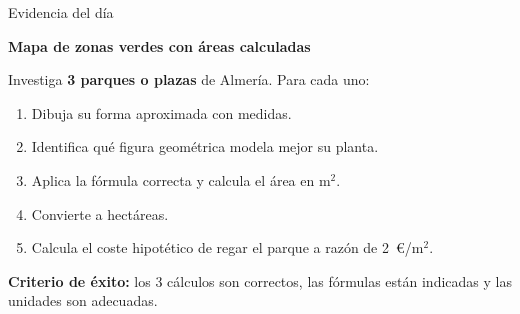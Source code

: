 \documentclass[aspectratio=169, 10pt, spanish]{beamer}
\begin{document}
\begin{frame}{Evidencia del día}
  \begin{evidenciabox}
    \textbf{Mapa de zonas verdes con áreas calculadas}

    \vspace{0.2cm}
    Investiga \textbf{3 parques o plazas} de Almería.
    Para cada uno:
    \begin{enumerate}
      \item Dibuja su forma aproximada con medidas.
      \item Identifica qué figura geométrica modela mejor su planta.
      \item Aplica la fórmula correcta y calcula el área en m$^2$.
      \item Convierte a hectáreas.
      \item Calcula el coste hipotético de regar el parque
            a razón de 2~€/m$^2$.
    \end{enumerate}
    \vspace{0.2cm}
    \textbf{Criterio de éxito:} los 3 cálculos son correctos,
    las fórmulas están indicadas y las unidades son adecuadas.
  \end{evidenciabox}
\end{frame}
\end{document}
